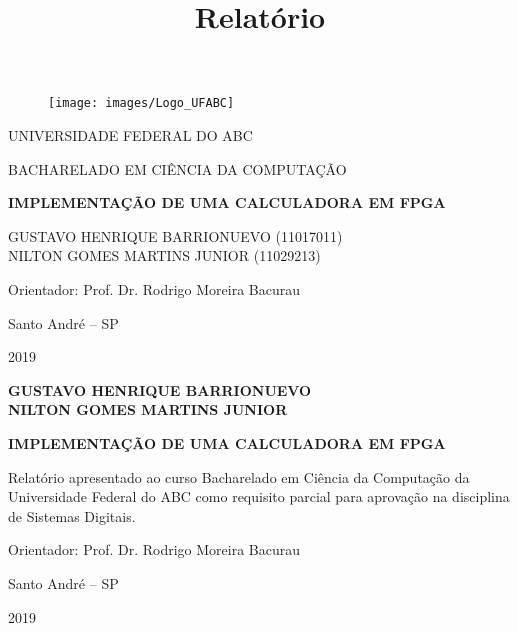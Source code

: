 \documentclass[a4paper,11pt]{article}
\title{Relatório}
\begin{document}


\begin{titlepage}

\begin{figure}
	\label{Logo UFABC}
	\vspace{-1\baselineskip}
	\centering
	\texttt{[image: images/Logo\_UFABC]}
\end{figure}

\uppercase{Universidade Federal do ABC}

\uppercase{Bacharelado em Ciência da Computação}

\vfill
\begin{center}

\uppercase{\textbf{Implementação de uma calculadora em FPGA}}

\vfill

\uppercase{Gustavo Henrique Barrionuevo (11017011)\\ Nilton Gomes Martins Junior (11029213)}
\vspace{1cm}

Orientador: Prof. Dr. Rodrigo Moreira Bacurau

\vfill

Santo André -- SP

2019
\end{center}
\end{titlepage}



\begin{titlepage}
\begin{center}
\uppercase{\textbf{Gustavo Henrique Barrionuevo \\ Nilton Gomes Martins Junior}}

\vfill

\uppercase{\textbf{Implementação de uma calculadora em FPGA}}
\end{center}

\vfill

\hfill \begin{minipage}{0.5\textwidth}
Relatório apresentado ao curso Bacharelado em Ciência da Computação da Universidade Federal do ABC como requisito parcial para aprovação na disciplina de Sistemas Digitais.
\vspace{1cm}

Orientador: Prof. Dr. Rodrigo Moreira Bacurau
\end{minipage}

\vfill

\begin{center}
Santo André -- SP

2019
\end{center}
\end{titlepage}
\end{document}
